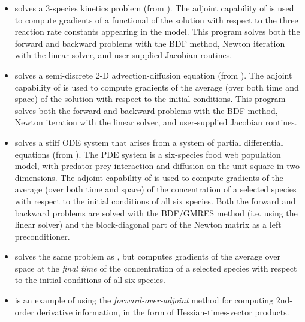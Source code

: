 \begin{itemize}
\item {}
  solves a 3-species kinetics problem (from ).
  \newline
  The adjoint capability of {\cvodes} is used to compute gradients
  of a functional of the solution with respect to the three
  reaction rate constants appearing in the model.
  This program solves both the forward and backward problems with the BDF method, 
  Newton iteration with the {\cvdense} linear solver, and user-supplied    
  Jacobian routines.
\item {}
  solves a semi-discrete 2-D advection-diffusion equation (from ).
  \newline
  The adjoint capability of {\cvodes} is used to compute gradients
  of the average (over both time and space) of the solution with respect to
  the initial conditions.
  This program solves both the forward and backward problems with the BDF method, 
  Newton iteration with the {\cvband} linear solver, and user-supplied     
  Jacobian routines.
\item {}
  solves a stiff ODE system that arises from a system of partial differential
  equations (from ).  The PDE system is a six-species
  food web population model, with predator-prey interaction and diffusion 
  on the unit square in two dimensions.
  \newline
  The adjoint capability of {\cvodes} is used to compute gradients of the
  average (over both time and space) of the concentration of a selected species
  with respect to the initial conditions of all six species.
  Both the forward and backward problems are solved with the BDF/GMRES method 
  (i.e. using the {\cvspgmr} linear solver) and the block-diagonal part of the  
  Newton matrix as a left preconditioner.
\item {}
  solves the same problem as , but computes gradients of the
  average over space at the {\em final time} of the concentration of a selected species
  with respect to the initial conditions of all six species.


\item {}
  is an example of using the {\em forward-over-adjoint} method for
  computing 2nd-order derivative information, in the form of Hessian-times-vector
  products.

\end{itemize}

